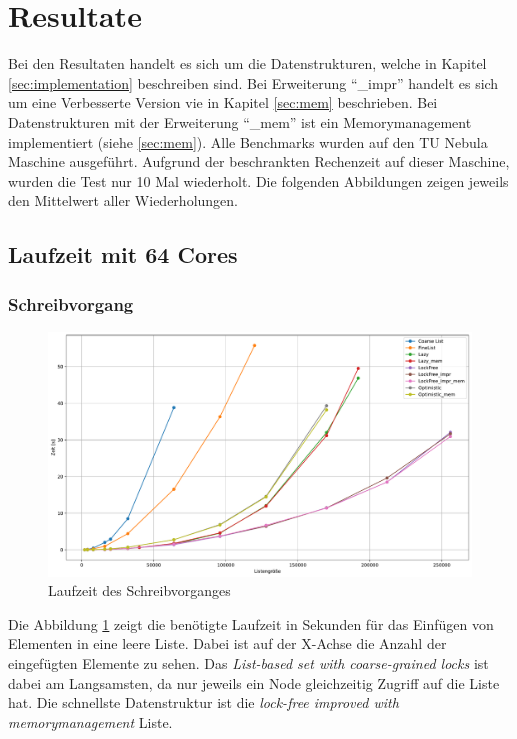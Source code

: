 \section{Resultate}
Bei den Resultaten handelt es sich um die Datenstrukturen, welche in Kapitel \ref{sec:implementation} beschreiben sind.
Bei Erweiterung ``\_impr'' handelt es sich um eine Verbesserte Version vie in Kapitel \ref{sec:mem} beschrieben.
Bei Datenstrukturen mit der Erweiterung ``\_mem'' ist ein Memorymanagement implementiert (siehe \ref{sec:mem}).
Alle Benchmarks wurden auf den TU Nebula Maschine ausgeführt. Aufgrund der beschrankten Rechenzeit auf dieser Maschine,
wurden die Test nur 10 Mal wiederholt. Die folgenden Abbildungen zeigen jeweils den Mittelwert aller Wiederholungen.

\subsection{Laufzeit mit 64 Cores}

\subsubsection{Schreibvorgang}
\begin{figure}[ht!]
	\centering
	\includegraphics[width=1.0\linewidth]{./plots_pdf/write_time} 
	\caption{Laufzeit des Schreibvorganges}
	\label{fig:write_time} 
\end{figure}
Die Abbildung \ref{fig:write_time} zeigt die benötigte Laufzeit in Sekunden für das Einfügen von Elementen in eine leere Liste.
Dabei ist auf der X-Achse die Anzahl der eingefügten Elemente zu sehen. 
Das \textit{List-based set with coarse-grained locks} ist dabei am Langsamsten, da nur jeweils ein Node gleichzeitig 
Zugriff auf die Liste hat. Die schnellste Datenstruktur ist die \textit{lock-free improved with memorymanagement} Liste.

